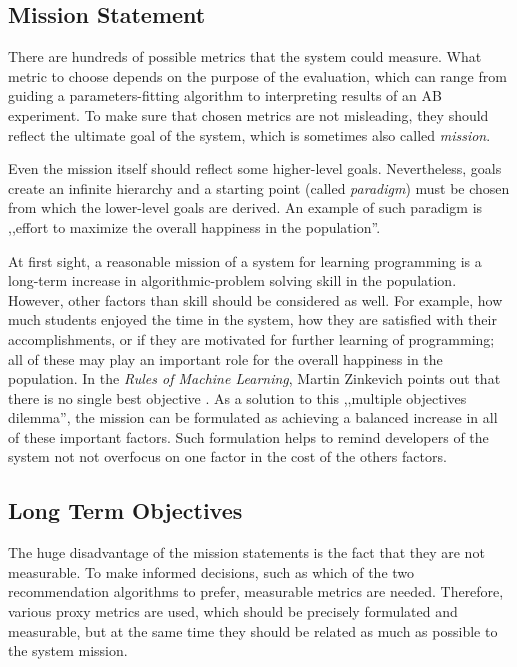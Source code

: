 \subsection{Mission Statement}
\label{sec:mission}

There are hundreds of possible metrics that the system could measure.
What metric to choose depends on the purpose of the evaluation,
  which can range from guiding a parameters-fitting algorithm
  to interpreting results of an AB experiment.
To make sure that chosen metrics are not misleading,
  they should reflect the ultimate goal of the system,
  which is sometimes also called \emph{mission}.

Even the mission itself should reflect some higher-level goals.
Nevertheless, goals create an infinite hierarchy
  and a starting point (called \emph{paradigm}) must be chosen from which
  the lower-level goals are derived.
An example of such paradigm is
  ,,effort to maximize the overall happiness in the population''.

At first sight, a reasonable mission of a system for learning programming
  is a long-term increase in algorithmic-problem solving skill in the population.
However, other factors than skill should be considered as well.
For example, how much students enjoyed the time in the system,
  how they are satisfied with their accomplishments,
  or if they are motivated for further learning of programming;
  all of these may play an important role for the overall happiness in the population.
In the \emph{Rules of Machine Learning}, Martin Zinkevich
  points out that there is no single best objective \cite[][Rule \#39]{google-ml-rules}.
As a solution to this ,,multiple objectives dilemma'',
  the mission can be formulated as achieving a balanced increase in all
  of these important factors.
Such formulation helps to remind developers of the system not not overfocus on one factor
  in the cost of the others factors.


\subsection{Long Term Objectives}

The huge disadvantage of the mission statements
  is the fact that they are not measurable.
To make informed decisions,
  such as which of the two recommendation algorithms to prefer,
  measurable metrics are needed.
Therefore, various proxy metrics are used,
  which should be precisely formulated and measurable,
  but at the same time they should be related as much as possible to the system mission.


